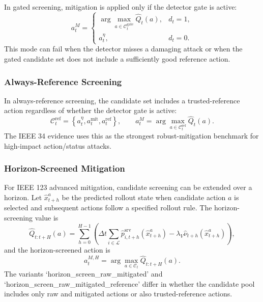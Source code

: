 In gated screening, mitigation is applied only if the detector gate is active:
\begin{equation}
    a_t^{M}
    =
    \begin{cases}
        \displaystyle
        \arg\max_{a \in \mathcal{C}_t^{\mathrm{gate}}}
        \widehat{Q}_t(a),
        & d_t=1,\\[2mm]
        a_t^{\eta},
        & d_t=0.
    \end{cases}
    \label{eq:gated_screening}
\end{equation}
This mode can fail when the detector misses a damaging attack or when the gated candidate set does not include a sufficiently good reference action.

\subsubsection{Always-Reference Screening}

In always-reference screening, the candidate set includes a trusted-reference action regardless of whether the detector gate is active:
\begin{equation}
    \mathcal{C}_t^{\mathrm{ref}}
    =
    \left\{
        a_t^{\eta},
        a_t^{\mathrm{mit}},
        a_t^{\mathrm{ref}}
    \right\},
    \qquad
    a_t^{M}
    =
    \arg\max_{a \in \mathcal{C}_t^{\mathrm{ref}}}
    \widehat{Q}_t(a).
    \label{eq:always_reference_screening}
\end{equation}
The IEEE 34 evidence uses this as the strongest robust-mitigation benchmark for high-impact action/status attacks.

\subsubsection{Horizon-Screened Mitigation}

For IEEE 123 advanced mitigation, candidate screening can be extended over a horizon. Let $\hat{x}_{t+h}^{a}$ be the predicted rollout state when candidate action $a$ is selected and subsequent actions follow a specified rollout rule. The horizon-screening value is
\begin{equation}
    \widehat{Q}_{t:t+H}(a)
    =
    \sum_{h=0}^{H-1}
    \left(
        \Delta t
        \sum_{i \in \mathcal{L}}
        \hat{p}^{\mathrm{srv}}_{i,t+h}(\hat{x}_{t+h}^{a})
        -
        \lambda_V
        \widehat{\nu}_{t+h}(\hat{x}_{t+h}^{a})
    \right),
    \label{eq:horizon_screening_score}
\end{equation}
and the horizon-screened action is
\begin{equation}
    a_t^{M,H}
    =
    \arg\max_{a \in \mathcal{C}_t}
    \widehat{Q}_{t:t+H}(a).
    \label{eq:horizon_screening_action}
\end{equation}
The variants `horizon\_screen\_raw\_mitigated' and `horizon\_screen\_raw\_mitigated\_reference' differ in whether the candidate pool includes only raw and mitigated actions or also trusted-reference actions.

